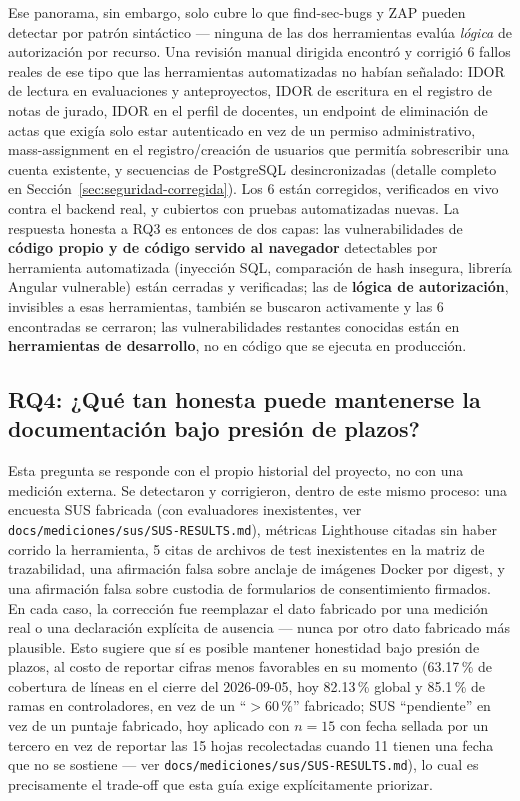 Ese panorama, sin embargo, solo cubre lo que find-sec-bugs y ZAP pueden detectar por patrón sintáctico
--- ninguna de las dos herramientas evalúa \emph{lógica} de autorización por recurso. Una revisión manual
dirigida encontró y corrigió 6 fallos reales de ese tipo que las herramientas automatizadas no habían
señalado: IDOR de lectura en evaluaciones y anteproyectos, IDOR de escritura en el registro de notas de
jurado, IDOR en el perfil de docentes, un endpoint de eliminación de actas que exigía solo estar
autenticado en vez de un permiso administrativo, mass-assignment en el registro/creación de usuarios que
permitía sobrescribir una cuenta existente, y secuencias de PostgreSQL desincronizadas (detalle completo
en Sección~\ref{sec:seguridad-corregida}). Los 6 están corregidos, verificados en vivo contra el backend
real, y cubiertos con pruebas automatizadas nuevas. La respuesta honesta a RQ3 es entonces de dos capas:
las vulnerabilidades de \textbf{código propio y de código servido al navegador} detectables por
herramienta automatizada (inyección SQL, comparación de hash insegura, librería Angular vulnerable) están
cerradas y verificadas; las de \textbf{lógica de autorización}, invisibles a esas herramientas, también se
buscaron activamente y las 6 encontradas se cerraron; las vulnerabilidades restantes conocidas están en
\textbf{herramientas de desarrollo}, no en código que se ejecuta en producción.

\subsection*{RQ4: ¿Qué tan honesta puede mantenerse la documentación bajo presión de plazos?}
Esta pregunta se responde con el propio historial del proyecto, no con una medición externa. Se
detectaron y corrigieron, dentro de este mismo proceso: una encuesta SUS fabricada (con evaluadores
inexistentes, ver \texttt{docs/mediciones/sus/SUS-RESULTS.md}), métricas Lighthouse citadas sin haber corrido la herramienta, 5 citas de
archivos de test inexistentes en la matriz de trazabilidad, una afirmación falsa sobre anclaje de
imágenes Docker por digest, y una afirmación falsa sobre custodia de formularios de consentimiento
firmados. En cada caso, la corrección fue reemplazar el dato fabricado por una medición real o una
declaración explícita de ausencia --- nunca por otro dato fabricado más plausible. Esto sugiere que sí es
posible mantener honestidad bajo presión de plazos, al costo de reportar cifras menos favorables en su
momento (63.17\,\% de cobertura de líneas en el cierre del 2026-09-05, hoy 82.13\,\% global y 85.1\,\% de ramas en controladores, en
vez de un ``$>$60\,\%'' fabricado; SUS ``pendiente'' en vez de un puntaje fabricado, hoy aplicado con
$n=15$ con fecha sellada por un tercero en vez de reportar las 15 hojas recolectadas cuando 11 tienen una fecha que no se
sostiene --- ver \texttt{docs/mediciones/sus/SUS-RESULTS.md}), lo cual es precisamente el trade-off que
esta guía exige explícitamente priorizar.
\newpage
